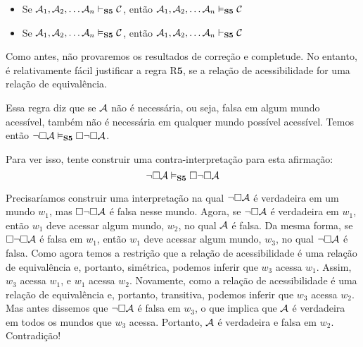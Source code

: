 \begin{itemize}
	\item Se $\mathcal{A}_1,\mathcal{A}_2, \dots \mathcal{A}_n\vdash_{\mathbf{S5}} \mathcal{C}$, então $\mathcal{A}_1,\mathcal{A}_2, \dots \mathcal{A}_n\vDash_{\mathbf{S5}} \mathcal{C}$
	\item Se $\mathcal{A}_1,\mathcal{A}_2, \dots \mathcal{A}_n\vDash_{\mathbf{S5}} \mathcal{C}$, então $\mathcal{A}_1,\mathcal{A}_2, \dots \mathcal{A}_n\vdash_{\mathbf{S5}} \mathcal{C}$
\end{itemize}
Como antes,  não  provaremos os resultados de correção e completude.  No entanto, é relativamente fácil  justificar  a regra R$\mathbf{5}$,  se a relação de acessibilidade for uma relação de equivalência.

Essa regra diz que se $\mathcal{A}$ não é necessária, ou seja, falsa em algum mundo acessível, também não é necessária em qualquer mundo possível acessível. Temos então $\neg\Box \mathcal{A} \vDash_{\mathbf{S5}}  \Box\neg\Box \mathcal{A}$.

Para ver isso, tente construir uma contra-interpretação para esta afirmação:
\[
	\neg\Box\mathcal{A} \vDash_{\mathbf{S5}}  \Box \neg\Box \mathcal{A}
\]
 
Precisaríamos construir uma interpretação  na qual  $\neg\Box\mathcal{A}$ é verdadeira em um mundo $w_1$, mas  $\Box \neg\Box \mathcal{A}$  é falsa nesse mundo.  Agora, se $\neg\Box\mathcal{A}$ é verdadeira em  $w_1$, então  $w_1$ deve acessar algum mundo, $w_2$, no qual $\mathcal{A}$ é falsa. Da mesma forma, se $\Box \neg\Box \mathcal{A}$ é falsa em  $w_1$, então  $w_1$ deve acessar algum mundo, $w_3$, no qual $\neg\Box \mathcal{A}$ é falsa. Como agora temos a restrição que a relação de acessibilidade é uma relação de equivalência e, portanto, simétrica, podemos inferir que $w_3$ acessa  $w_1$. Assim, $w_3$ acessa  $w_1$, e  $w_1$ acessa $w_2$. Novamente, como a relação de acessibilidade é uma relação de equivalência e, portanto, transitiva, podemos inferir que $w_3$ acessa $w_2$. Mas antes dissemos que $\neg\Box \mathcal{A}$ é falsa em $w_3$, o que implica que $\mathcal{A}$ é verdadeira em todos os mundos que $w_3$ acessa. Portanto, $\mathcal{A}$ é verdadeira e falsa em $w_2$. Contradição!

